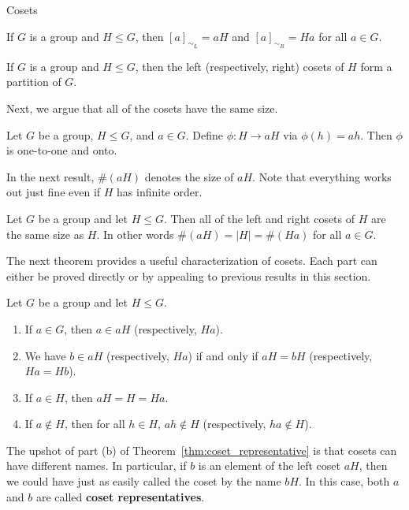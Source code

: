 \begin{section}{Cosets}
\begin{theorem}
If $G$ is a group and $H\leq G$, then $[a]_{\sim_L}=aH$ and $[a]_{\sim_R}=Ha$ for all $a\in G$.
\end{theorem}

\begin{corollary}
If $G$ is a group and $H\leq G$, then the left (respectively, right) cosets of $H$ form a partition of $G$.
\end{corollary}

Next, we argue that all of the cosets have the same size.

\begin{theorem}
Let $G$ be a group, $H\leq G$, and $a\in G$.  Define $\phi:H\to aH$ via $\phi(h)=ah$.  Then $\phi$ is one-to-one and onto.
\end{theorem}

In the next result, $\#(aH)$ denotes the size of $aH$. Note that everything works out just fine even if $H$ has infinite order.

\begin{corollary}\label{cor:cosets_same_size}
Let $G$ be a group and let $H\leq G$.  Then all of the left and right cosets of $H$ are the same size as $H$.  In other words $\#(aH)=|H|=\#(Ha)$ for all $a\in G$.
\end{corollary}

The next theorem provides a useful characterization of cosets.  Each part can either be proved directly or by appealing to previous results in this section.

\begin{theorem}\label{thm:coset_representative}
Let $G$ be a group and let $H\leq G$.
\begin{enumerate}[label=\textrm{(\alph*)}]
\item If $a\in G$, then $a\in aH$ (respectively, $Ha$).
\item We have $b\in aH$ (respectively, $Ha$) if and only if $aH=bH$ (respectively, $Ha=Hb$).
\item If $a\in H$, then $aH=H=Ha$.
\item If $a\notin H$, then for all $h\in H$, $ah\notin H$ (respectively, $ha \notin H$).
\end{enumerate}
\end{theorem}

The upshot of part (b) of Theorem~\ref{thm:coset_representative} is that cosets can have different names.  In particular, if $b$ is an element of the left coset $aH$, then we could have just as easily called the coset by the name $bH$.  In this case, both $a$ and $b$ are called \textbf{coset representatives}.


\end{section}
